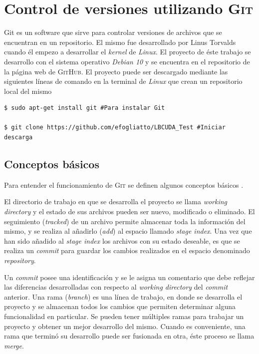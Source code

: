 \newpage
\section{Control de versiones utilizando \textsc{Git}}
\label{sec:git}

Git es un software que sirve para controlar versiones de archivos que se encuentran en un repositorio. El mismo fue desarrollado por Linus Torvalds cuando él empezo a desarrollar el \textit{kernel} de \textit{Linux}. El proyecto de éste trabajo se desarrollo con el sistema operativo \textit{Debian 10} y se encuentra en el repositorio de la página web de \textsc{GitHub}. El proyecto puede ser descargado mediante las siguientes líneas de comando en la terminal de \textit{Linux} que crean un repositorio local del mismo
{\footnotesize
	\begin{frame}{}
		\begin{lstlisting}
$ sudo apt-get install git #Para instalar Git

$ git clone https://github.com/efogliatto/LBCUDA_Test #Iniciar descarga 
		\end{lstlisting}
		
	\end{frame}
}
\subsection{Conceptos básicos}

Para entender el funcionamiento de \textsc{Git} se definen algunos conceptos básicos \cite{user:2020:git}. 

El directorio de trabajo en que se desarrolla el proyecto se llama \textit{working directory} y el estado de sus archivos pueden ser nuevo, modificado o eliminado. El seguimiento (\textit{tracked}) de un archivo permite almacenar toda la información del mismo, y se realiza al añadirlo (\textit{add}) al espacio llamado \textit{stage index}. Una vez que han sido añadido al \textit{stage index} los archivos con su estado deseable, es que se realiza un \textit{commit} para guardar los cambios realizados en el espacio denominado \textit{repository}.

Un \textit{commit} posee una identificación y se le asigna un comentario que debe reflejar las diferencias desarrolladas con respecto al \textit{working directory} del \textit{commit} anterior. Una rama (\textit{branch}) es una línea de trabajo, en donde se desarrolla el proyecto y se almacenan todos los cambios que permiten determinar alguna funcionalidad en particular. Se pueden tener múltiples ramas para trabajar un proyecto y obtener un mejor desarrollo del mismo. Cuando es conveniente, una rama que terminó su desarrollo puede ser fusionada en otra, éste proceso se llama \textit{merge}.


